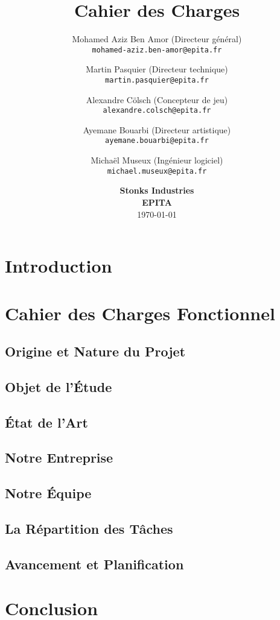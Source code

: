 \documentclass[11pt]{article}
\title{
    Cahier des Charges \\
    \textbf{\gameName}
    \vspace{6cm}
}
\author{
    Mohamed Aziz Ben Amor (Directeur général) \\
    \texttt{mohamed-aziz.ben-amor@epita.fr}
    \vspace{0.5cm}\and
    Martin Pasquier (Directeur technique) \\
    \texttt{martin.pasquier@epita.fr}
    \vspace{0.5cm}\and
    Alexandre Cölsch (Concepteur de jeu) \\
    \texttt{alexandre.colsch@epita.fr}
    \vspace{0.5cm}\and
    Ayemane Bouarbi (Directeur artistique) \\
    \texttt{ayemane.bouarbi@epita.fr}
    \vspace{0.5cm}\and
    Michaël Museux (Ingénieur logiciel) \\
    \texttt{michael.museux@epita.fr}
}
\date{
    \vspace{1.5cm}
    \textbf{Stonks Industries} \\
    \vspace{0.3cm}
    \textbf{EPITA} \\
    \vspace{1.5cm}
    \today
}
\begin{document}
\begin{titlepage}
    \maketitle
    \thispagestyle{empty} %
\end{titlepage}

\newpage
\thispagestyle{empty}
\mbox{}

\newpage
\tableofcontents

\newpage
\section{Introduction}





\newpage
\section{Cahier des Charges Fonctionnel}

\subsection{Origine et Nature du Projet}



\subsection{Objet de l'\'Etude}



\subsection{\'Etat de l'Art}



\subsection{Notre Entreprise}



\subsection{Notre \'Equipe}



\subsection{La Répartition des Tâches}



\subsection{Avancement et Planification}






\newpage
\section{Conclusion}


\end{document}
